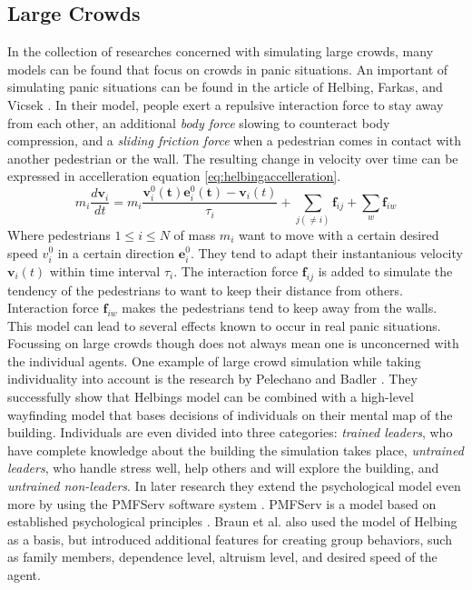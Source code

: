\documentclass[11pt, a4paper]{book}
\begin{document}
\subsection{Large Crowds}
In the collection of researches concerned with simulating large crowds, many models can be found that focus on crowds in panic situations. An important of simulating panic situations can be found in the article of Helbing, Farkas, and Vicsek \cite{citeulike1656038}. In their model, people exert a repulsive interaction force to stay away from each other, an additional \emph{body force} slowing to counteract body compression, and a \emph{sliding friction force} when a pedestrian comes in contact with another pedestrian or the wall. The resulting change in velocity over time can be expressed in accelleration equation \ref{eq:helbingaccelleration}.
\begin{equation}
m_i \frac{d \boldsymbol{v}_i}{dt} = m_i \frac{\boldsymbol{v}_i^0 (\boldsymbol{t}) \boldsymbol{e}_i^0(\boldsymbol{t}) - \boldsymbol{v}_i(t)}{\tau_i}
+\sum_{j (\neq i)} \boldsymbol{f}_{ij} + \sum_w \boldsymbol{f}_{iw}
\label{eq:helbingaccelleration}
\end{equation}
Where pedestrians $1 \leq i \leq N$ of mass $m_i$ want to move with a certain desired speed $v_i^0$ in a certain direction $\boldsymbol{e}_i^0$. They tend to adapt their instantanious velocity $\boldsymbol{v}_i(t)$ within time interval $\tau_i$. The interaction force $\boldsymbol{f}_{ij}$ is added to simulate the tendency of the pedestrians to want to keep their distance from others. Interaction force $\boldsymbol{f}_{iw}$ makes the pedestrians tend to keep away from the walls. This model can lead to several effects known to occur in real panic situations. Focussing on large crowds though does not always mean one is unconcerned with the individual agents. One example of large crowd simulation while taking individuality into account is the research by Pelechano and Badler \cite{pelechano2006modeling}. They successfully show that Helbings model can be combined with a high-level wayfinding model that bases decisions of individuals on their mental map of the building. Individuals are even divided into three categories: \emph{trained leaders}, who have complete knowledge about the building the simulation takes place, \emph{untrained leaders}, who handle stress well, help others and will explore the building, and \emph{untrained non-leaders}. In later research they extend the psychological model even more by using the PMFServ software system \cite{citeulike1080090}. PMFServ is a model based on established psychological principles \cite{silverman2006human}. Braun et al. \cite{10.1109CASA.2003.1199317} also used the model of Helbing as a basis, but introduced additional features for creating group behaviors, such as family members, dependence level, altruism level, and desired speed of the agent.\\
\end{document}

